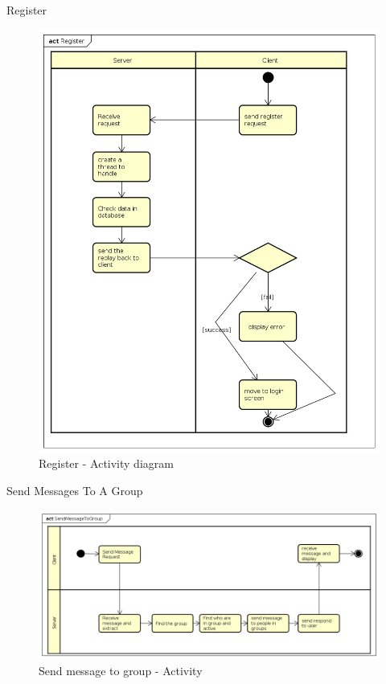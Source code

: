 \documentclass{beamer}
\begin{document}
\begin{frame}{Register}
\begin{figure}
	\begin{center}
		\includegraphics[scale=0.2]{Register.png}
		\caption{Register - Activity diagram}
	\end{center}
\end{figure}
\end{frame}

\begin{frame}{Send Messages To A Group}
\begin{figure}
	\begin{center}
		\includegraphics[scale=0.3]{SendMessageToGroup.png}
		\caption{Send message to group - Activity}
	\end{center}

\end{figure}
\end{frame}
\end{document}
